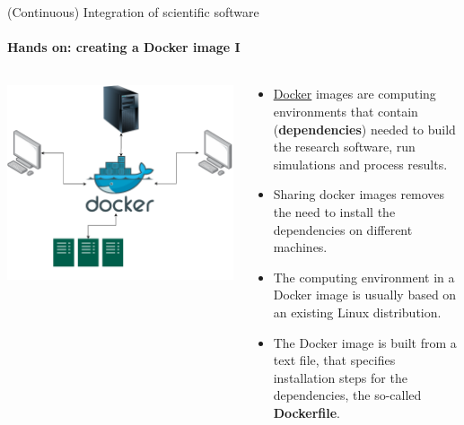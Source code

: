 \begin{frame}{(Continuous) Integration of scientific software} 
    \framesubtitle{Hands on: creating a Docker image I} 
    \vfill

    \begin{columns}
        \begin{column}[c]{0.5\textwidth}
            \centering
            \includegraphics[width=0.8\columnwidth]{figures/docker-description.pdf}
        \end{column}
        \begin{column}[c]{0.5\textwidth}

            \begin{itemize}
                \item \href{https://docs.docker.com/}{Docker} images are computing environments that contain (\textbf{dependencies}) needed to build the research software, run simulations and process results. 
                \item Sharing docker images removes the need to install the dependencies on different machines. 
                \item The computing environment in a Docker image is usually based on an existing Linux distribution. 
                \item The Docker image is built from a text file, that specifies installation steps for the dependencies, the so-called \textbf{Dockerfile}.
            \end{itemize}
        \end{column}
    \end{columns}
\end{frame}

